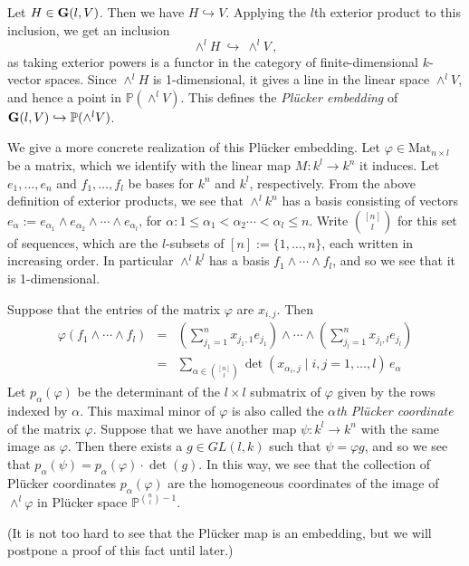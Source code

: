\documentclass[12pt]{amsart}
\newcommand{\G}{{\bf G}}
\begin{document}
Let $H\in \G(l,V)$.
Then we have $H\hookrightarrow V$.
Applying the $l$th exterior product to this inclusion, we get an inclusion
$$
  \wedge^l H\ \hookrightarrow\ \wedge^l V\,,
$$
as taking exterior powers is a functor in the category of finite-dimensional
$k$-vector spaces.
Since $\wedge^l H$ is 1-dimensional, it gives a line in the linear space 
$\wedge^l V$, and hence a point in ${\mathbb P}(\wedge^l V)$.
This defines the {\sl Pl\"ucker embedding} of 
$\G(l,V)\hookrightarrow{\mathbb P}(\wedge^l V)$.

We give a more concrete realization of this Pl\"ucker embedding.
Let $\varphi\in\mbox{Mat}_{n\times l}$ be a matrix, which we identify with
the linear map $M:k^l\to k^n$ it induces.
Let $e_1,\ldots,e_n$ and $f_1,\ldots,f_l$ be bases for $k^n$ and $k^l$,
respectively. 
From the above definition of exterior products, we see that $\wedge^lk^n$
has a basis consisting of vectors
$e_\alpha:=e_{\alpha_1}\wedge e_{\alpha_2}\wedge\cdots\wedge e_{\alpha_l}$,
for $\alpha\colon 1\leq\alpha_1<\alpha_2\cdots<\alpha_l\leq n$.
Write $\binom{[n]}{l}$ for this set of sequences, which are the $l$-subsets
of $[n]:=\{1,\ldots,n\}$, each written in increasing order.
In particular $\wedge^lk^l$ has a basis $f_1\wedge\cdots\wedge f_l$, and so
we see that it is 1-dimensional.

Suppose that the entries of the matrix $\varphi$ are $x_{i,j}$.
Then 
%
\begin{eqnarray*}
  \varphi(f_1\wedge\cdots\wedge f_l)&=&
  \left(\sum_{j_1=1}^n x_{j_1,1}e_{j_1}\right)\wedge\cdots\wedge
  \left(\sum_{j_l=1}^n x_{j_l,l}e_{j_l}\right)\\
   &=&
   \sum_{\alpha\in\binom{[n]}{l}} \det(x_{\alpha_i,j}\mid i,j=1,\ldots,l) 
    \,e_\alpha
\end{eqnarray*}
%
Let $p_\alpha(\varphi)$ be the determinant of the $l\times l$ submatrix of
$\varphi$ given by the rows indexed by $\alpha$.
This maximal minor of $\varphi$ is also called the 
{\sl $\alpha$th Pl\"ucker coordinate} of the matrix $\varphi$.
Suppose that we have another map $\psi\colon k^l\to k^n$ with the same image
as $\varphi$.
Then there exists a $g\in GL(l,k)$ such that $\psi=\varphi g$, and so we see
that $p_\alpha(\psi)=p_\alpha(\varphi)\cdot \det(g)$.
In this way, we see that the collection of Pl\"ucker coordinates
$p_\alpha(\varphi)$ are the homogeneous coordinates of the image of
$\wedge^l\varphi$ in Pl\"ucker space ${\mathbb P}^{\binom{n}{l}-1}$.

(It is not too hard to see that the Pl\"ucker map is an embedding, but we
will postpone a proof of this fact until later.)
\end{document}
